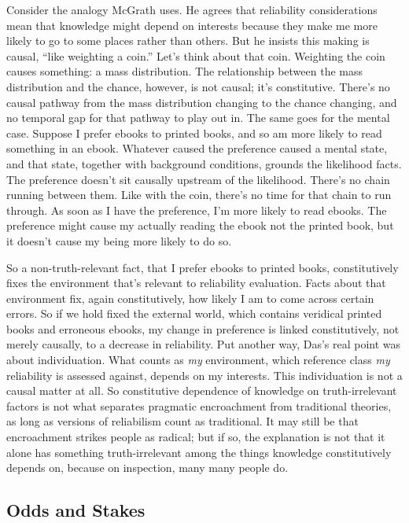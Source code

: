 \documentclass[
  11pt,
  letterpaper,
  DIV=11,
  numbers=noendperiod,
  twoside]{scrartcl}
\begin{document}
Consider the analogy McGrath uses. He agrees that reliability
considerations mean that knowledge might depend on interests because
they make me more likely to go to some places rather than others. But he
insists this making is causal, ``like weighting a coin.'' Let's think
about that coin. Weighting the coin causes something: a mass
distribution. The relationship between the mass distribution and the
chance, however, is not causal; it's constitutive. There's no causal
pathway from the mass distribution changing to the chance changing, and
no temporal gap for that pathway to play out in. The same goes for the
mental case. Suppose I prefer ebooks to printed books, and so am more
likely to read something in an ebook. Whatever caused the preference
caused a mental state, and that state, together with background
conditions, grounds the likelihood facts. The preference doesn't sit
causally upstream of the likelihood. There's no chain running between
them. Like with the coin, there's no time for that chain to run through.
As soon as I have the preference, I'm more likely to read ebooks. The
preference might cause my actually reading the ebook not the printed
book, but it doesn't cause my being more likely to do so.

So a non-truth-relevant fact, that I prefer ebooks to printed books,
constitutively fixes the environment that's relevant to reliability
evaluation. Facts about that environment fix, again constitutively, how
likely I am to come across certain errors. So if we hold fixed the
external world, which contains veridical printed books and erroneous
ebooks, my change in preference is linked constitutively, not merely
causally, to a decrease in reliability. Put another way, Das's real
point was about individuation. What counts as \emph{my} environment,
which reference class \emph{my} reliability is assessed against, depends
on my interests. This individuation is not a causal matter at all. So
constitutive dependence of knowledge on truth-irrelevant factors is not
what separates pragmatic encroachment from traditional theories, as long
as versions of reliabilism count as traditional. It may still be that
encroachment strikes people as radical; but if so, the explanation is
not that it alone has something truth-irrelevant among the things
knowledge constitutively depends on, because on inspection, many many
people do.

\subsection{Odds and Stakes}\label{sec-mcgrath-odds}
\end{document}
